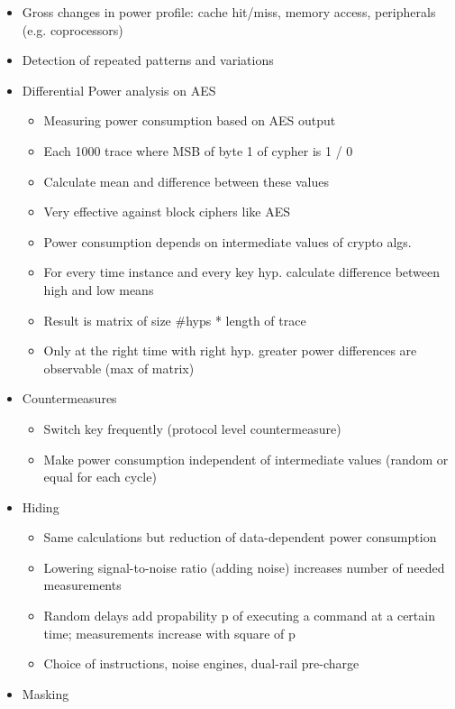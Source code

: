 \documentclass[11pt, paper=a4, twocolumn]{scrartcl}
\begin{document}
\begin{itemize}
\begin{itemize}
					\item Gross changes in power profile: cache hit/miss, memory access, peripherals (e.g. coprocessors)
					\item Detection of repeated patterns and variations
					\item Differential Power analysis on AES
						\begin{itemize}
							\item Measuring power consumption based on AES output
							\item Each 1000 trace where MSB of byte 1 of cypher is 1 / 0
							\item Calculate mean and difference between these values
							\item Very effective against block ciphers like AES
							\item Power consumption depends on intermediate values of crypto algs.
							\item For every time instance and every key hyp. calculate difference between high and low means
							\item Result is matrix of size \#hyps * length of trace
							\item Only at the right time with right hyp. greater power differences are observable 
								(max of matrix)
						\end{itemize}
					\item Countermeasures
						\begin{itemize}
							\item Switch key frequently (protocol level countermeasure)
							\item Make power consumption independent of intermediate values (random or equal for each cycle)
						\end{itemize}
					\item Hiding
						\begin{itemize}
							\item Same calculations but reduction of data-dependent power consumption
							\item Lowering signal-to-noise ratio (adding noise) increases number of needed measurements
							\item Random delays add propability p of executing a command at a certain time; measurements 
								increase with square of p
							\item Choice of instructions, noise engines, dual-rail pre-charge
						\end{itemize}
					\item Masking

\end{itemize}
\end{itemize}
\end{document}

